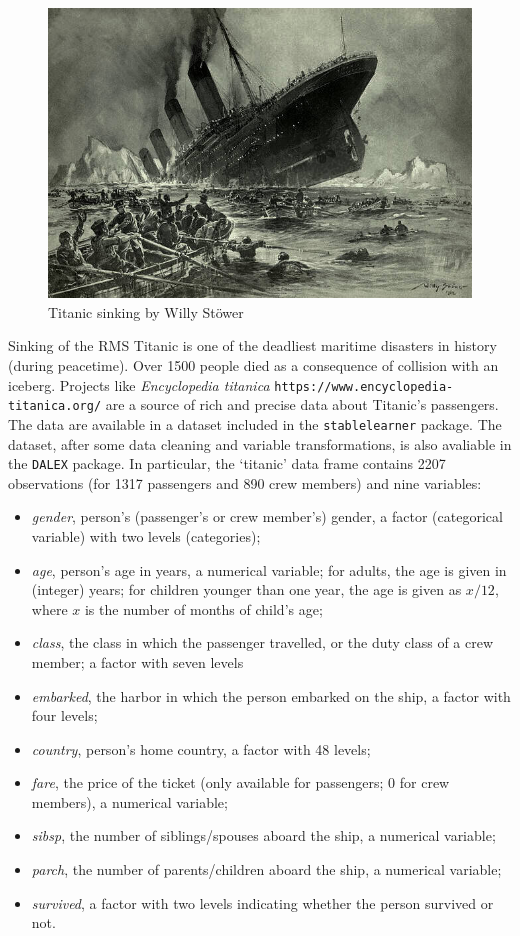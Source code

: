 \documentclass[12pt,]{krantz}
\providecommand{\tightlist}{%
  \setlength{\itemsep}{0pt}\setlength{\parskip}{0pt}}
\begin{document}
\begin{figure}
\centering
\includegraphics{figure/Titanic.jpg}
\caption{Titanic sinking by Willy Stöwer}
\end{figure}

Sinking of the RMS Titanic is one of the deadliest maritime disasters in history (during peacetime). Over 1500 people died as a consequence of collision with an iceberg. Projects like \emph{Encyclopedia titanica} \texttt{https://www.encyclopedia-titanica.org/} are a source of rich and precise data about Titanic's passengers. The data are available in a dataset included in the \texttt{stablelearner} package. The dataset, after some data cleaning and variable transformations, is also avaliable in the \texttt{DALEX} package. In particular, the `titanic' data frame contains 2207 observations (for 1317 passengers and 890 crew members) and nine variables:

\begin{itemize}
\tightlist
\item
  \emph{gender}, person's (passenger's or crew member's) gender, a factor (categorical variable) with two levels (categories);
\item
  \emph{age}, person's age in years, a numerical variable; for adults, the age is given in (integer) years; for children younger than one year, the age is given as \(x/12\), where \(x\) is the number of months of child's age;
\item
  \emph{class}, the class in which the passenger travelled, or the duty class of a crew member; a factor with seven levels
\item
  \emph{embarked}, the harbor in which the person embarked on the ship, a factor with four levels;
\item
  \emph{country}, person's home country, a factor with 48 levels;
\item
  \emph{fare}, the price of the ticket (only available for passengers; 0 for crew members), a numerical variable;
\item
  \emph{sibsp}, the number of siblings/spouses aboard the ship, a numerical variable;
\item
  \emph{parch}, the number of parents/children aboard the ship, a numerical variable;
\item
  \emph{survived}, a factor with two levels indicating whether the person survived or not.
\end{itemize}
\end{document}

